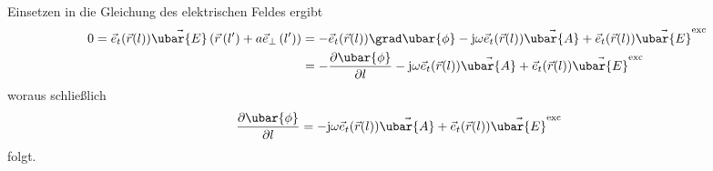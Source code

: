Einsetzen in die Gleichung des elektrischen Feldes ergibt
\begin{align}
	0=\vec{e}_{t}(\vec{r}(l)) \vec{\ubar{E}}\left(\vec{r}\left(l^{\prime}\right)+a \vec{e}_{\perp}\left(l^{\prime}\right)\right) & =-\vec{e}_{t}(\vec{r}(l)) \grad \ubar{\phi}-\mathrm{j} \omega \vec{e}_{t}(\vec{r}(l)) \vec{\ubar{A}}+\vec{e}_{t}(\vec{r}(l)) \vec{\ubar{E}}^{\text {exc }}  \\
	& =-\frac{\partial \ubar{\phi}}{\partial l}-\mathrm{j} \omega \vec{e}_{t}(\vec{r}(l)) \vec{\ubar{A}}+\vec{e}_{t}(\vec{r}(l)) \vec{\ubar{E}}^{\text {exc }} 
\end{align}
woraus schließlich
\begin{equation}
	\frac{\partial \ubar{\phi}}{\partial l}=-\mathrm{j} \omega \vec{e}_{t}(\vec{r}(l)) \vec{\ubar{A}}+\vec{e}_{t}(\vec{r}(l)) \vec{\ubar{E}}^{\mathrm{exc}} 
\end{equation}
folgt.

